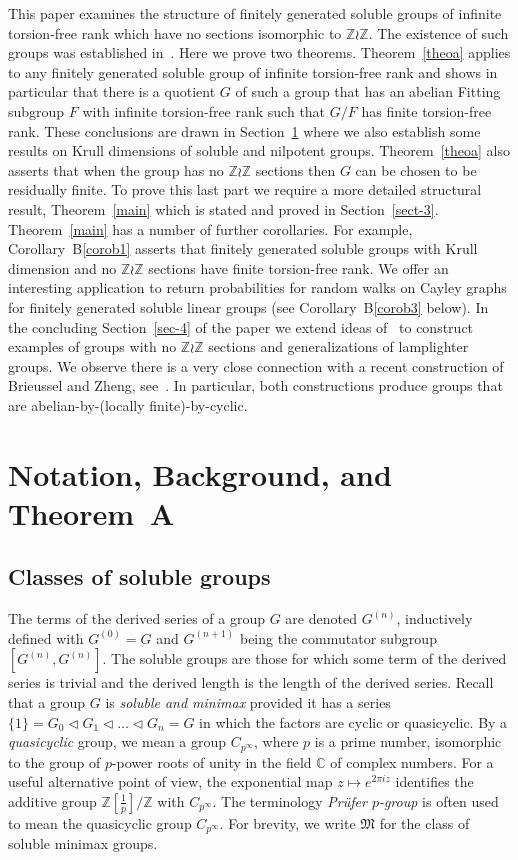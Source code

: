 \documentclass[11pt]{article}
\theoremstyle{definition}
\numberwithin{equation}{section}
\numberwithin{figure}{section}
\numberwithin{table}{section}
\newcommand{\Z}{\mathbb{Z}}
\newcommand{\ComplexNumberField}{\mathbb{C}}
\begin{document}
This paper examines the structure of finitely generated soluble groups of infinite torsion-free rank which have no sections isomorphic to $\Z\wr\Z$. The existence of such groups was established in~\cite{K2}. Here we prove two theorems. Theorem~\ref{theoa} applies to any finitely generated soluble group of infinite torsion-free rank and shows in particular that there is a quotient $G$ of such a group that has an abelian Fitting subgroup $F$ with infinite torsion-free rank such that $G/F$ has finite torsion-free rank. These conclusions are drawn in Section~\ref{sec-2} where we also establish some results on Krull dimensions of soluble and nilpotent groups. Theorem~\ref{theoa} also asserts that when the group has no $\Z\wr\Z$ sections then $G$ can be chosen to be residually finite. To prove this last part we require a more detailed structural result, Theorem~\ref{main} which is stated and proved in Section~\ref{sect-3}. Theorem~\ref{main} has a number of further corollaries. For example, Corollary~B\ref{corob1} asserts that finitely generated soluble groups with Krull dimension and no $\Z\wr\Z$ sections have finite torsion-free rank. We offer an interesting application to return probabilities for random walks on Cayley graphs for finitely generated soluble linear groups (see Corollary~B\ref{corob3} below). In the concluding Section~\ref{sec-4} of the paper we extend ideas of~\cite{K2} to construct examples of groups with no $\Z\wr\Z$ sections and generalizations of lamplighter groups. We observe there is a very close connection with a recent construction of Brieussel and Zheng, see~\cite{Brieussel,BZ}. In particular, both constructions produce groups that are abelian-by-(locally finite)-by-cyclic.



\section{Notation, Background, and Theorem~A}\label{sec-2}

\subsection{Classes of soluble groups} The terms of the derived series of a group $G$ are denoted $G^{(n)}$, inductively defined with $G^{(0)}=G$ and $G^{(n+1)}$ being the commutator subgroup $[G^{(n)},G^{(n)}]$. The soluble groups are those for which some term of the derived series is trivial and the derived length is the length of the derived series. Recall that a group $G$ is \emph{soluble and minimax} provided it has a series $\{1\}=G_0\triangleleft G_1\triangleleft\dots\triangleleft G_n=G$ in which the factors are cyclic or quasicyclic. By a \emph{quasicyclic} group, we mean a group $C_{p^\infty}$, where $p$ is a prime number, isomorphic to the group of $p$-power roots of unity in the field $\ComplexNumberField$ of complex numbers. For a useful alternative point of view, the exponential map $z\mapsto e^{2\pi iz}$ identifies the additive group $\Z[\frac1p]/\Z$ with $C_{p^\infty}$. The terminology \emph{Prüfer $p$-group} is often used to mean the quasicyclic group $C_{p^\infty}$. For brevity, we write $\mathfrak M$ for the class of soluble minimax groups.
\end{document}
